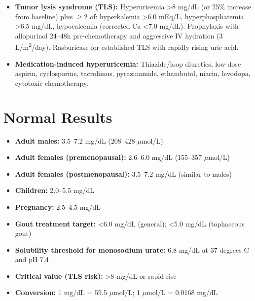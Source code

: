 \begin{itemize}
  \item \textbf{Tumor lysis syndrome (TLS):} Hyperuricemia >8 mg/dL (or 25\% increase from baseline) plus $\geq$2 of: hyperkalemia >6.0 mEq/L, hyperphosphatemia >6.5 mg/dL, hypocalcemia (corrected Ca <7.0 mg/dL). Prophylaxis with allopurinol 24--48h pre-chemotherapy and aggressive IV hydration (3 L/m\textsuperscript{2}/day). Rasburicase for established TLS with rapidly rising uric acid.
  \item \textbf{Medication-induced hyperuricemia:} Thiazide/loop diuretics, low-dose aspirin, cyclosporine, tacrolimus, pyrazinamide, ethambutol, niacin, levodopa, cytotoxic chemotherapy.
\end{itemize}

\section*{Normal Results}
\begin{itemize}
  \item \textbf{Adult males:} 3.5--7.2 mg/dL (208--428 $\mu$mol/L)
  \item \textbf{Adult females (premenopausal):} 2.6--6.0 mg/dL (155--357 $\mu$mol/L)
  \item \textbf{Adult females (postmenopausal):} 3.5--7.2 mg/dL (similar to males)
  \item \textbf{Children:} 2.0--5.5 mg/dL
  \item \textbf{Pregnancy:} 2.5--4.5 mg/dL
  \item \textbf{Gout treatment target:} <6.0 mg/dL (general); <5.0 mg/dL (tophaceous gout)
  \item \textbf{Solubility threshold for monosodium urate:} 6.8 mg/dL at 37 degrees C and pH 7.4
  \item \textbf{Critical value (TLS risk):} >8 mg/dL or rapid rise
  \item \textbf{Conversion:} 1 mg/dL = 59.5 $\mu$mol/L; 1 $\mu$mol/L = 0.0168 mg/dL
\end{itemize}

